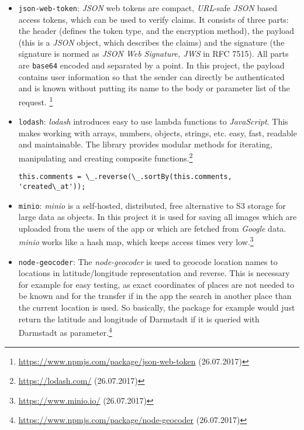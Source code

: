 \begin{itemize}
	\item \texttt{json-web-token}: \textit{JSON} web tokens are compact, \textit{URL}-safe \textit{JSON} based access tokens, which can be used to verify claims. It consists of three parts: the header (defines the token type, and the encryption method), the payload (this is a \textit{JSON} object, which describes the claims) and the signature (the signature is normed as \textit{JSON Web Signature, JWS} in RFC 7515). All parts are \texttt{base64} encoded and separated by a point. In this project, the payload contains user information so that the sender can directly be authenticated and is known without putting its name to the body or parameter list of the request.	\footnote{\url{https://www.npmjs.com/package/json-web-token} (26.07.2017)}
	\item \texttt{lodash}: \textit{lodash} introduces easy to use lambda functions to \textit{JavaScript}. This makes working with arrays, numbers, objects, strings, etc. easy, fast, readable and maintainable. The library provides modular methods for iterating, manipulating and creating composite functions.\footnote{\url{https://lodash.com/} (26.07.2017)}
	\begin{lstlisting}[caption={Example usage of \textit{lodash} functionality. The shown line of code is extracted from the 'addComment' method. By using this package, in this single line all comments of the current object, where the comments are added, are sorted and the order gets reversed. It is much more readable and compact than coding this by hand.}, label=lst:lodash]
	this.comments = \_.reverse(\_.sortBy(this.comments, 'created\_at'));
	\end{lstlisting}
	\item \texttt{minio}: \textit{minio} is a self-hosted, distributed, free alternative to S3 storage for large data as objects. In this project it is used for saving all images which are uploaded from the users of the app or which are fetched from \textit{Google} data. \textit{minio} works like a hash map, which keeps access times very low.\footnote{\url{https://www.minio.io/} (26.07.2017)}
	\item \texttt{node-geocoder}: The \textit{node-geocoder} is used to geocode location names to locations in latitude/longitude representation and reverse. This is necessary for example for easy testing, as exact coordinates of places are not needed to be known and for the transfer if in the app the search in another place than the current location is used. So basically, the package for example would just return the latitude and longitude of Darmstadt if it is queried with Darmstadt as parameter.\footnote{\url{https://www.npmjs.com/package/node-geocoder} (26.07.2017)}

\end{itemize}
